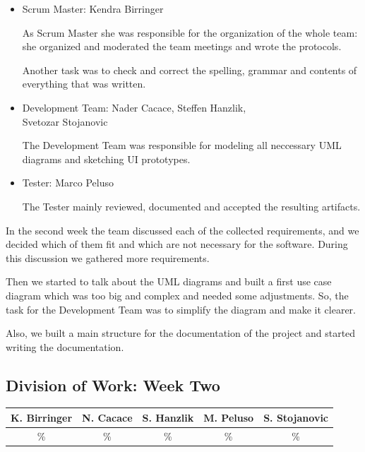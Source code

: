 \documentclass[a4paper, 12pt]{article}
\begin{document}
\begin{itemize}
\item Scrum Master: Kendra Birringer

As Scrum Master she was responsible for the organization of the whole team: she organized and moderated the team meetings and wrote the protocols. 

Another task was to check and correct the spelling, grammar and contents of everything that was written.

\item Development Team: Nader Cacace, Steffen Hanzlik,\\
      Svetozar Stojanovic

The Development Team was responsible for modeling all neccessary UML diagrams and sketching UI prototypes.

\item Tester: Marco Peluso

The Tester mainly reviewed, documented and accepted the resulting artifacts.
\end{itemize}


In the second week the team discussed each of the collected requirements, and we decided which of them fit and which are not necessary for the software. During this discussion we gathered more requirements.

Then we started to talk about the UML diagrams and built a first use case diagram which was too big and complex and needed some adjustments. So, the task for the Development Team was to simplify the diagram and make it clearer.

Also, we built a main structure for the documentation of the project and started writing the documentation.

\newpage
\subsection{Division of Work: Week Two}

\begin{table}[h]
\centering
\setlength{\tabcolsep}{10pt}
\begin{tabular}{|c|c|c|c|c|}
\hline
K. Birringer & N. Cacace & S. Hanzlik & M. Peluso & S. Stojanovic\\
\hline
\% & \% & \% & \% & \% \\ 
\hline
\end{tabular}
\end{table}

\end{document}

